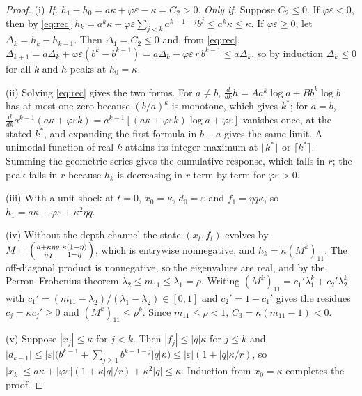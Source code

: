 \begin{proof}
(i) \emph{If.} $h_1-h_0=a\kappa+\varphi\varepsilon-\kappa=C_2>0$. \emph{Only if.} Suppose $C_2\le0$. If $\varphi\varepsilon<0$, then by \eqref{eq:rec} $h_k=a^k\kappa+\varphi\varepsilon\sum_{j<k}a^{k-1-j}b^j\le a^k\kappa\le\kappa$. If $\varphi\varepsilon\ge0$, let $\Delta_k=h_k-h_{k-1}$. Then $\Delta_1=C_2\le0$ and, from \eqref{eq:rec}, $\Delta_{k+1}=a\Delta_k+\varphi\varepsilon(b^{k}-b^{k-1})=a\Delta_k-\varphi\varepsilon\,r\,b^{k-1}\le a\Delta_k$, so by induction $\Delta_k\le0$ for all $k$ and $h$ peaks at $h_0=\kappa$.

(ii) Solving \eqref{eq:rec} gives the two forms. For $a\ne b$, $\frac{d}{dk}h=Aa^k\log a+Bb^k\log b$ has at most one zero because $(b/a)^k$ is monotone, which gives $k^*$; for $a=b$, $\frac{d}{dk}a^{k-1}(a\kappa+\varphi\varepsilon k)=a^{k-1}[(a\kappa+\varphi\varepsilon k)\log a+\varphi\varepsilon]$ vanishes once, at the stated $k^*$, and expanding the first formula in $b-a$ gives the same limit. A unimodal function of real $k$ attains its integer maximum at $\lfloor k^*\rfloor$ or $\lceil k^*\rceil$. Summing the geometric series gives the cumulative response, which falls in $r$; the peak falls in $r$ because $h_k$ is decreasing in $r$ term by term for $\varphi\varepsilon>0$.

(iii) With a unit shock at $t=0$, $x_0=\kappa$, $d_0=\varepsilon$ and $f_1=\eta q\kappa$, so $h_1=a\kappa+\varphi\varepsilon+\kappa^2\eta q$.

(iv) Without the depth channel the state $(x_t,f_t)$ evolves by $M=\begin{psmallmatrix}a+\kappa\eta q&\kappa(1-\eta)\\ \eta q&1-\eta\end{psmallmatrix}$, which is entrywise nonnegative, and $h_k=\kappa(M^k)_{11}$. The off-diagonal product is nonnegative, so the eigenvalues are real, and by the Perron--Frobenius theorem $\lambda_2\le m_{11}\le\lambda_1=\rho$. Writing $(M^k)_{11}=c_1'\lambda_1^k+c_2'\lambda_2^k$ with $c_1'=(m_{11}-\lambda_2)/(\lambda_1-\lambda_2)\in[0,1]$ and $c_2'=1-c_1'$ gives the residues $c_j=\kappa c_j'\ge0$ and $(M^k)_{11}\le\rho^k$. Since $m_{11}\le\rho<1$, $C_3=\kappa(m_{11}-1)<0$.

(v) Suppose $|x_j|\le\kappa$ for $j<k$. Then $|f_j|\le|q|\kappa$ for $j\le k$ and $|d_{k-1}|\le|\varepsilon|\bigl(b^{k-1}+\sum_{j\ge1}b^{k-1-j}|q|\kappa\bigr)\le|\varepsilon|(1+|q|\kappa/r)$, so $|x_k|\le a\kappa+|\varphi\varepsilon|(1+\kappa|q|/r)+\kappa^2|q|\le\kappa$. Induction from $x_0=\kappa$ completes the proof.
\end{proof}

